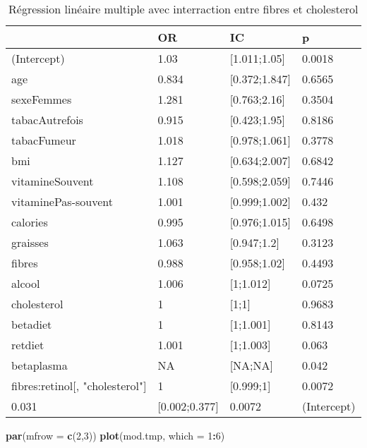 \documentclass[]{article}
\newenvironment{Shaded}{\begin{snugshade}}{\end{snugshade}}
\newcommand{\KeywordTok}[1]{\textcolor[rgb]{0.13,0.29,0.53}{\textbf{#1}}}
\newcommand{\DataTypeTok}[1]{\textcolor[rgb]{0.13,0.29,0.53}{#1}}
\newcommand{\DecValTok}[1]{\textcolor[rgb]{0.00,0.00,0.81}{#1}}
\newcommand{\OperatorTok}[1]{\textcolor[rgb]{0.81,0.36,0.00}{\textbf{#1}}}
\newcommand{\NormalTok}[1]{#1}
\begin{document}
\begin{table}

\caption{\label{tab:unnamed-chunk-90}Régression linéaire multiple avec interraction entre fibres et cholesterol}
\centering
\begin{tabular}[t]{l|l|l|l}
\hline
  & OR & IC & p\\
\hline
\rowcolor[HTML]{BBD2E1}  (Intercept) & 1.03 & [1.011;1.05] & 0.0018\\
\hline
age & 0.834 & [0.372;1.847] & 0.6565\\
\hline
\rowcolor[HTML]{BBD2E1}  sexeFemmes & 1.281 & [0.763;2.16] & 0.3504\\
\hline
tabacAutrefois & 0.915 & [0.423;1.95] & 0.8186\\
\hline
\rowcolor[HTML]{BBD2E1}  tabacFumeur & 1.018 & [0.978;1.061] & 0.3778\\
\hline
bmi & 1.127 & [0.634;2.007] & 0.6842\\
\hline
\rowcolor[HTML]{BBD2E1}  vitamineSouvent & 1.108 & [0.598;2.059] & 0.7446\\
\hline
vitaminePas-souvent & 1.001 & [0.999;1.002] & 0.432\\
\hline
\rowcolor[HTML]{BBD2E1}  calories & 0.995 & [0.976;1.015] & 0.6498\\
\hline
graisses & 1.063 & [0.947;1.2] & 0.3123\\
\hline
\rowcolor[HTML]{BBD2E1}  fibres & 0.988 & [0.958;1.02] & 0.4493\\
\hline
alcool & 1.006 & [1;1.012] & 0.0725\\
\hline
\rowcolor[HTML]{BBD2E1}  cholesterol & 1 & [1;1] & 0.9683\\
\hline
betadiet & 1 & [1;1.001] & 0.8143\\
\hline
\rowcolor[HTML]{BBD2E1}  retdiet & 1.001 & [1;1.003] & 0.063\\
\hline
betaplasma & NA & [NA;NA] & 0.042\\
\hline
\rowcolor[HTML]{BBD2E1}  fibres:retinol[, "cholesterol"] & 1 & [0.999;1] & 0.0072\\
\hline
0.031 & [0.002;0.377] & 0.0072 & (Intercept)\\
\hline
\end{tabular}
\end{table}

\begin{Shaded}
\begin{Highlighting}[]
\KeywordTok{par}\NormalTok{(}\DataTypeTok{mfrow =} \KeywordTok{c}\NormalTok{(}\DecValTok{2}\NormalTok{,}\DecValTok{3}\NormalTok{))}
\KeywordTok{plot}\NormalTok{(mod.tmp, }\DataTypeTok{which =} \DecValTok{1}\OperatorTok{:}\DecValTok{6}\NormalTok{)}
\end{Highlighting}
\end{Shaded}
\end{document}
